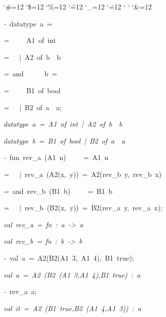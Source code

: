 \begin{list}{}
{\setlength{\leftmargin}{\leftmargini}
\setlength{\rightmargin}{0cm}
\setlength{\itemindent}{0cm}
\setlength{\listparindent}{0cm}
\setlength{\itemsep}{0cm}
\setlength{\parsep}{0cm}
\setlength{\labelsep}{0cm}
\setlength{\labelwidth}{0cm}
\catcode`\#=12
\catcode`\$=12
\catcode`\%=12
\catcode`\^=12
\catcode`\_=12
\catcode`\.=12
\catcode`
\catcode`
\catcode`\&=12
\ttfamily}
\small
\item[]\textsl{-\ }datatype\ a\ =
\item[]\textsl{=\ }\ \ \ \ A1\ of\ int
\item[]\textsl{=\ }\ \ |\ A2\ of\ b\ \ b
\item[]\textsl{=\ }and\ \ \ \ \ \ b\ =
\item[]\textsl{=\ }\ \ \ \ B1\ of\ bool
\item[]\textsl{=\ }\ \ |\ B2\ of\ a\ \ a;
\item[]\textsl{datatype\ a\ =\ A1\ of\ int\ |\ A2\ of\ b\ \ b}
\item[]\textsl{datatype\ b\ =\ B1\ of\ bool\ |\ B2\ of\ a\ \ a}
\item[]\textsl{-\ }fun\ rev_a\ (A1\ n)\ \ \ \ \ =\ A1\ n
\item[]\textsl{=\ }\ \ |\ rev_a\ (A2(x,\ y))\ =\ A2(rev_b\ y,\ rev_b\ x)
\item[]\textsl{=\ }and\ rev_b\ (B1\ b)\ \ \ \ \ =\ B1\ b
\item[]\textsl{=\ }\ \ |\ rev_b\ (B2(x,\ y))\ =\ B2(rev_a\ y,\ rev_a\ x);
\item[]\textsl{val\ rev_a\ =\ fn\ :\ a\ ->\ a}
\item[]\textsl{val\ rev_b\ =\ fn\ :\ b\ ->\ b}
\item[]\textsl{-\ }val\ a\ =\ A2(B2(A1\ 3,\ A1\ 4),\ B1\ true);
\item[]\textsl{val\ a\ =\ A2\ (B2\ (A1\ 3,A1\ 4),B1\ true)\ :\ a}
\item[]\textsl{-\ }rev_a\ a;
\item[]\textsl{val\ it\ =\ A2\ (B1\ true,B2\ (A1\ 4,A1\ 3))\ :\ a}
\end{list}
